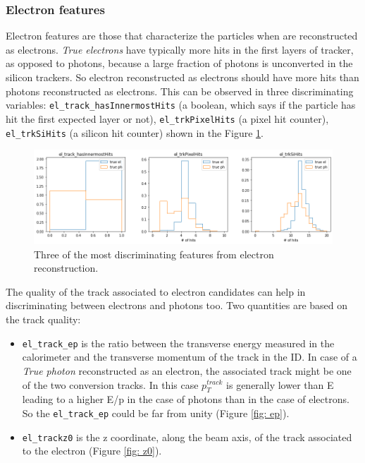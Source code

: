 \documentclass[a4paper, oneside, 11pt, openright]{book}
\begin{document}
				\subsubsection{Electron features}
					Electron features are those that characterize the particles when are reconstructed as electrons. \textit{True electrons} have typically more hits in the first layers of tracker, as opposed to photons, because a large fraction of photons is unconverted in the silicon trackers. So electron reconstructed as electrons should have more hits than photons reconstructed as electrons. This can be observed in three discriminating variables: \texttt{el\_track\_hasInnermostHits} (a boolean, which says if the particle has hit the first expected layer or not), \texttt{el\_trkPixelHits} (a pixel hit counter), \texttt{el\_trkSiHits} (a silicon hit counter) shown in the Figure \ref{fig:el_hit}.
					\begin{figure}[h!]
						\centering
						\includegraphics[width=0.7\textheight]{tesi_images/el_hit.png}
						\caption{Three of the most discriminating features from electron reconstruction.}
						\label{fig:el_hit}
					\end{figure}
					
					The quality of the track associated to electron candidates can help in discriminating between electrons and photons too. Two quantities are based on the track quality:
					\begin{itemize}
						\item \texttt{el\_track\_ep} is the ratio between the transverse energy measured in the calorimeter and the transverse momentum of the track in the ID. In case of a \textit{True photon} reconstructed as an electron, the associated track might be one of the two conversion tracks. In this case $p_T^{track}$ is generally lower than E leading to a higher E/p in the case of photons than in the case of electrons. So the \texttt{el\_track\_ep} could be far from unity (Figure \ref{fig: ep}).
						\item \texttt{el\_trackz0} is the z coordinate, along the beam axis, of the track associated to the electron (Figure \ref{fig: z0}).
					\end{itemize}
				
\end{document}

